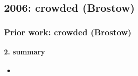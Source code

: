 \subsection{2006: crowded (Brostow)}
\begin{frame}
\frametitle{Prior work: crowded (Brostow)}
\framesubtitle{2. summary}
\mypagenum
	\begin{itemize}
		\item 
	\end{itemize}
\end{frame}